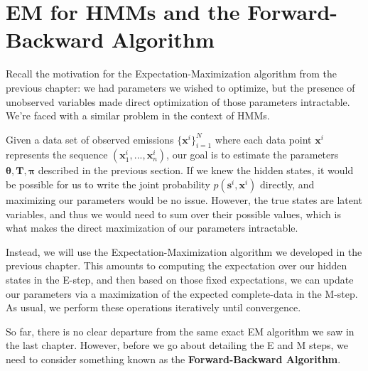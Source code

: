 \section{EM for HMMs and the Forward-Backward Algorithm}
Recall the motivation for the Expectation-Maximization algorithm from the previous chapter: we had parameters we wished to optimize, but the presence of unobserved variables made direct optimization of those parameters intractable. We're faced with a similar problem in the context of HMMs.

Given a data set of observed emissions $\{ \textbf{x}^{i} \}_{i=1}^{N}$ where each data point $\textbf{x}^{i}$ represents the sequence $(\textbf{x}_{1}^{i}, ..., \textbf{x}_{n}^{i})$, our goal is to estimate the parameters $\boldsymbol{\theta}, \textbf{T}, \boldsymbol{\pi}$ described in the previous section. If we knew the hidden states, it would be possible for us to write the joint probability $p(\textbf{s}^{i}, \textbf{x}^{i})$ directly, and maximizing our parameters would be no issue. However, the true states are latent variables, and thus we would need to sum over their possible values, which is what makes the direct maximization of our parameters intractable.

Instead, we will use the Expectation-Maximization algorithm we developed in the previous chapter. This amounts to computing the expectation over our hidden states in the E-step, and then based on those fixed expectations, we can update our parameters via a maximization of the expected complete-data in the M-step. As usual, we perform these operations iteratively until convergence.

So far, there is no clear departure from the same exact EM algorithm we saw in the last chapter. However, before we go about detailing the E and M steps, we need to consider something known as the \textbf{Forward-Backward Algorithm}.

